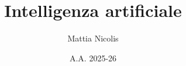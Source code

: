 \documentclass[a4paper, 12pt]{book}
\title{\textbf{Intelligenza artificiale}}
\author{Mattia Nicolis}
\date{A.A. 2025-26}
\begin{document}
    \maketitle

    \tableofcontents
    \markboth{}{}
\end{document}
